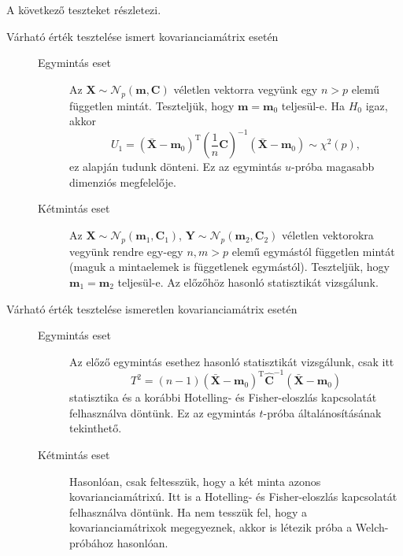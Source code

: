 \documentclass[%
	DIV=15,appendixprefix]{scrreprt}
\theoremstyle{definition}
\theoremstyle{remark}
\newcommand{\normald}{\mathcal{N}}
\DeclareMathOperator{\T}{T}
\begin{document}
A következő teszteket \cite[5.~fejezet, 6.~szakasz, 230--234.~oldal]{BollaKramli} részletezi.
\begin{description}
	\item[Várható érték tesztelése ismert kovarianciamátrix esetén]\leavevmode
		\begin{description}
			\item[Egymintás eset] Az $ \mathbf{ X } \sim \normald_{ p } \left( \mathbf{ m },{}
				\mathbf{ C } \right) $ véletlen vektorra vegyünk egy $ n > p $ elemű független
				mintát. Teszteljük, hogy $ \mathbf{ m } = \mathbf{ m }_{ 0 } $ teljesül-e. Ha
				$ H_{ 0 } $ igaz, akkor
				\begin{equation*}
					U_{ 1 } = \left( \bar{ \mathbf{ X } } -
					\mathbf{ m }_{ 0 } \right)^{ \T } \left( \frac{ 1 }{ n } \mathbf{ C }
					\right)^{ - 1 } \left( \bar{ \mathbf{ X } } - \mathbf{ m }_{ 0 } \right) \sim
					\chi^{ 2 } \left( p \right),
				\end{equation*}
				ez alapján tudunk dönteni. Ez az egymintás
				$ u $-próba magasabb dimenziós megfelelője.
			\item[Kétmintás eset] Az $ \mathbf{ X } \sim \normald_{ p } \left( \mathbf{ m }_{ 1 },{}
				\mathbf{ C }_{ 1 } \right) $, $ \mathbf{ Y } \sim \normald_{ p } \left(
				\mathbf{ m }_{ 2 },{} \mathbf{ C }_{ 2 } \right) $ véletlen vektorokra vegyünk
				rendre egy-egy $ n,{} m > p $ elemű egymástól független mintát (maguk a mintaelemek
				is függetlenek egymástól). Teszteljük, hogy $ \mathbf{ m }_{ 1 } =
				\mathbf{ m }_{ 2 } $ teljesül-e. Az előzőhöz hasonló statisztikát vizsgálunk.
		\end{description}
	\item[Várható érték tesztelése ismeretlen kovarianciamátrix esetén]\leavevmode
		\begin{description}
			\item[Egymintás eset] Az előző egymintás esethez hasonló statisztikát vizsgálunk, csak
			itt
			\begin{equation*}
				T^{ 2 } = \left( n - 1 \right) \left( \bar{ \mathbf{ X } } -
				\mathbf{ m }_{ 0 } \right)^{ \T } \hat{ \mathbf{ C } }^{ - 1 } \left( \bar{
				\mathbf{ X } } - \mathbf{ m }_{ 0 } \right)
			\end{equation*}
			statisztika és a korábbi Hotelling- és Fisher-eloszlás kapcsolatát felhasználva döntünk.
			Ez az egymintás $ t $-próba általánosításának tekinthető.
			\item[Kétmintás eset] Hasonlóan, csak feltesszük, hogy a két minta azonos
			kovarianciamátrixú. Itt is a Hotelling- és Fisher-eloszlás kapcsolatát felhasználva
			döntünk. Ha nem tesszük fel, hogy a kovarianciamátrixok megegyeznek, akkor is létezik
			próba a Welch-próbához hasonlóan.
		\end{description}
\end{description}
%
\end{document}
